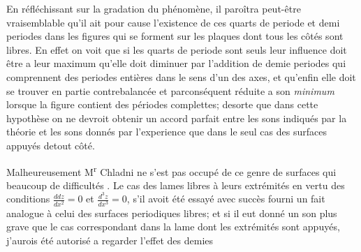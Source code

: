 \documentclass[11pt,a4paper]{article}
\begin{document}


En réfléchissant sur la gradation du phénomène, il paroîtra
peut-être vraisemblable qu'il ait pour cause l'existence de ces
quarts de periode et demi periodes dans les figures qui
se forment sur les plaques dont tous les côtés sont libres.
En effet on voit que si les quarts de periode sont seuls
leur influence doit être a leur maximum qu'elle doit diminuer
par l'addition de demie periodes qui comprennent des periodes
entières dans le sens d'un des axes, et qu'enfin elle doit
se trouver en partie contrebalancée et parconséquent réduite
a son \emph{minimum} lorsque la figure contient des périodes
complettes; desorte que  dans cette
hypothèse on ne devroit obtenir un accord parfait entre les sons
indiqués par la théorie et les sons donnés par l'experience
que dans le seul cas des surfaces appuyés detout côté.

Malheureusement M\textsuperscript{r} Chladni ne s'est pas occupé de ce
genre de surfaces qui   beaucoup de difficultés
. Le cas 
des lames libres à leurs extrémités en vertu des conditions
$\frac{ddz}{dx^2}=0$ et $\frac{d^3z}{dx^3}=0$,  s'il avoit été essayé avec succès
 fourni un fait analogue à celui des surfaces periodiques
libres; et si il eut donné un son plus grave que
le cas correspondant dans la lame dont les extrémités sont
appuyés, j'aurois été autorisé a regarder l'effet des demies
\end{document}
